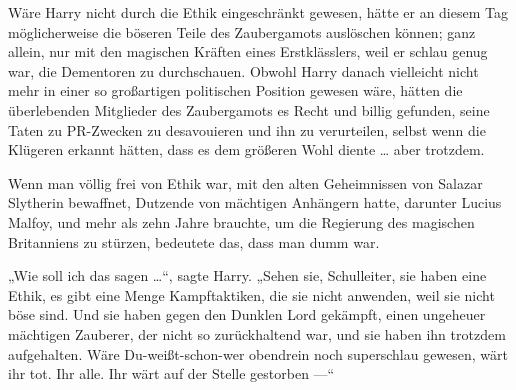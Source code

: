 Wäre Harry nicht durch die Ethik eingeschränkt gewesen, hätte er an diesem Tag möglicherweise die böseren Teile des Zaubergamots auslöschen können; ganz allein, nur mit den magischen Kräften eines Erstklässlers, weil er schlau genug war, die Dementoren zu durchschauen. Obwohl Harry danach vielleicht nicht mehr in einer so großartigen politischen Position gewesen wäre, hätten die überlebenden Mitglieder des Zaubergamots es Recht und billig gefunden, seine Taten zu PR-Zwecken zu desavouieren und ihn zu verurteilen, selbst wenn die Klügeren erkannt hätten, dass es dem größeren Wohl diente … aber trotzdem.

Wenn man völlig frei von Ethik war, mit den alten Geheimnissen von Salazar Slytherin bewaffnet, Dutzende von mächtigen Anhängern hatte, darunter Lucius Malfoy, und mehr als zehn Jahre brauchte, um die Regierung des magischen Britanniens zu stürzen, bedeutete das, dass man dumm war.

„Wie soll ich das sagen …“, sagte Harry.
„Sehen sie, Schulleiter, sie haben eine Ethik, es gibt eine Menge Kampftaktiken, die sie nicht anwenden, weil sie nicht böse sind. Und sie haben gegen den Dunklen Lord gekämpft, einen ungeheuer mächtigen Zauberer, der nicht so zurückhaltend war, und sie haben ihn trotzdem aufgehalten. Wäre Du-weißt-schon-wer obendrein noch superschlau gewesen, wärt ihr tot. Ihr alle. Ihr wärt auf der Stelle gestorben —“

